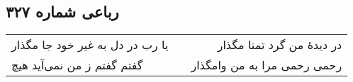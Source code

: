 \begin{center}
\section*{رباعی شماره ۳۲۷}
\label{sec:sh327}
\begin{longtable}{l p{0.5cm} r}
یا رب در دل به غیر خود جا مگذار
&&
در دیدهٔ من گرد تمنا مگذار
\\
گفتم گفتم ز من نمی‌آید هیچ
&&
رحمی رحمی مرا به من وامگذار
\\
\end{longtable}
\end{center}
